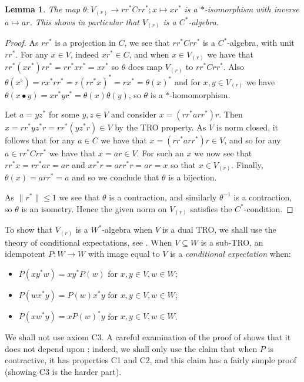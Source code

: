\documentclass[a4paper,11pt]{article}
\theoremstyle{plain}
\newtheorem{lemma}[proposition]{Lemma}
\theoremstyle{remark}
\begin{document}
\begin{lemma}
The map $\theta \colon V_{(r)} \to rr^* C rr^*; x \mapsto xr^*$ is a $*$-isomorphism with inverse $a\mapsto ar$.  This shows in particular that $V_{(r)}$ is a $C^*$-algebra.
\end{lemma}
\begin{proof}
As $rr^*$ is a projection in $C$, we see that $rr^* C rr^*$ is a $C^*$-algebra, with unit $rr^*$.  For any $x\in V$, indeed $xr^* \in C$, and when $x\in V_{(r)}$ we have that $rr^*(xr^*)rr^* = rr^* x r^* = xr^*$ so $\theta$ does map $V_{(r)}$ to $rr^* C rr^*$.  Also $\theta(x^\flat) = rx^*rr^* = r(rr^*x)^* = rx^* = \theta(x)^*$ and for $x,y\in V_{(r)}$ we have $\theta(x\bullet y) = xr^*yr^* = \theta(x)\theta(y)$, so $\theta$ is a $*$-homomorphism.

Let $a = yz^*$ for some $y,z\in V$ and consider $x = (rr^* a rr^*) r$.  Then $x = rr^* yz^* r = rr^* (yz^* r) \in V$ by the TRO property.  As $V$ is norm closed, it follows that for any $a\in C$ we have that $x = (rr^* a rr^*) r \in V$, and so for any $a\in rr^* C rr^*$ we have that $x = ar \in V$.  For such an $x$ we now see that $rr^* x = rr^* a r = ar$ and $x r^*r = arr^*r = ar = x$ so that $x\in V_{(r)}$.  Finally, $\theta(x) = arr^* = a$ and so we conclude that $\theta$ is a bijection.

As $\|r^*\|\leq 1$ we see that $\theta$ is a contraction, and similarly $\theta^{-1}$ is a contraction, so $\theta$ is an isometry.  Hence the given norm on $V_{(r)}$ satisfies the $C^*$-condition.
\end{proof}

To show that $V_{(r)}$ is a $W^*$-algebra when $V$ is a dual TRO, we shall use the theory of conditional expectations, see \cite[Theorem~2.5]{EOR_InjectivityNuclearityOS}.  When $V \subseteq W$ is a sub-TRO, an idempotent $P \colon W \to W$ with image equal to $V$ is a \emph{conditional expectation} when:
\begin{itemize}
    \item[C1:] $P(xy^*w) = xy^*P(w)$ for $x,y\in V, w\in W$;
    \item[C2:] $P(wx^*y) = P(w) x^*y$ for $x,y\in V, w\in W$;
    \item[C3:] $P(xw^*y) = xP(w)^*y$ for $x,y\in V, w\in W$.
\end{itemize}
We shall not use axiom C3.  A careful examination of the proof of \cite[Theorem~2.5]{EOR_InjectivityNuclearityOS} shows that it does not depend upon \cite[Proposition~2.4]{EOR_InjectivityNuclearityOS}; indeed, we shall only use the claim that when $P$ is contractive, it has properties C1 and C2, and this claim has a fairly simple proof (showing C3 is the harder part).
\end{document}
